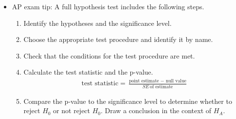 \begin{itemize}
\item AP exam tip:  A full hypothesis test includes the following steps.\vspace{-1mm}
\begin{enumerate}
\setlength{\itemsep}{0mm}
\item {}  Identify the hypotheses and the significance level.
\item  {}  Choose the appropriate test procedure and identify it by name.
\item  {}  Check that the conditions for the test procedure are met. 
\item {} Calculate the test statistic and the p-value.  
\begin{align*}
\text{test statistic} = \frac{\text{point estimate } - \text{ null value}}{SE\ \text{of estimate}}
\end{align*}
\item {} Compare the p-value to the significance level to determine whether to reject $H_0$ or not reject $H_0$.  Draw a conclusion in the context of $H_A$.\end{enumerate}


\end{itemize}
